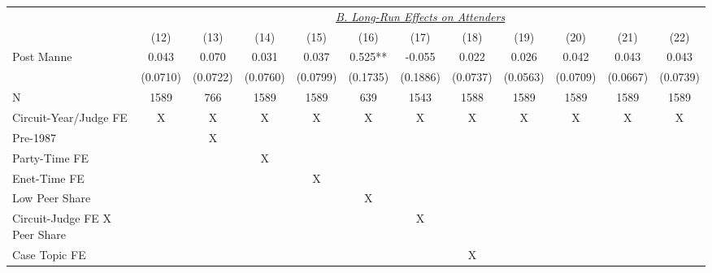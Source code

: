 \begin{center}
{\begin{tabular}{l*{11}{c}}
                    &\multicolumn{11}{c}{\uline{\textit{B. Long-Run Effects on Attenders}}}                                                                                              \\
                    &        (12)  &        (13)  &        (14)  &        (15)  &        (16)  &        (17)  &        (18)  &        (19)  &        (20)  &        (21)  &        (22)  \\
\cmidrule(lr){2-12}
Post Manne          &       0.043  &       0.070  &       0.031  &       0.037  &       0.525**&      -0.055  &       0.022  &       0.026  &       0.042  &       0.043  &       0.043  \\
                    &    (0.0710)  &    (0.0722)  &    (0.0760)  &    (0.0799)  &    (0.1735)  &    (0.1886)  &    (0.0737)  &    (0.0563)  &    (0.0709)  &    (0.0667)  &    (0.0739)  \\
\cmidrule(lr){1-12}
N                   &        1589  &         766  &        1589  &        1589  &         639  &        1543  &        1588  &        1589  &        1589  &        1589  &        1589  \\
Circuit-Year/Judge FE&           X  &           X  &           X  &           X  &           X  &           X  &           X  &           X  &           X  &           X  &           X  \\
Pre-1987            &              &           X  &              &              &              &              &              &              &              &              &              \\
Party-Time FE       &              &              &           X  &              &              &              &              &              &              &              &              \\
Enet-Time FE        &              &              &              &           X  &              &              &              &              &              &              &              \\
Low Peer Share      &              &              &              &              &           X  &              &              &              &              &              &              \\
Circuit-Judge FE X Peer Share&              &              &              &              &              &           X  &              &              &              &              &              \\
Case Topic FE       &              &              &              &              &              &              &           X  &              &              &              &              \\

\end{tabular}}
\end{center}
